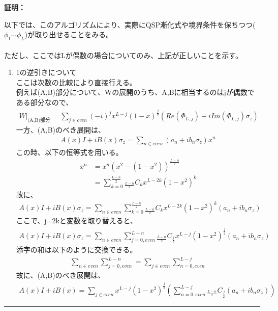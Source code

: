 \documentclass[a4paper,10.5pt]{article}
\numberwithin{equation}{section}
\newenvironment{proofbox}
{\begin{prooflabel}\textbf{証明：}\end{prooflabel}\vspace{0.8em}}
{\par\vspace{1em}\hrule\vspace{1em}}
\begin{document}
\begin{proofbox}
    以下では、このアルゴリズムにより、実際にQSP漸化式や境界条件を保ちつつ($\phi_{1}\cdots \phi_{L}$)が取り出せることをみる。\\
    \\
    ただし、ここではLが偶数の場合についてのみ、上記が正しいことを示す。
    \begin{enumerate}
        \item 1の逆引きについて\\
        ここは次数の比較により直接行える。\\
        例えば(A,B)部分について、Wの展開のうち、A,Bに相当するのはjが偶数である部分なので、
        \begin{align*}
            W|_{\text{(A,B)部分}}=\sum_{j\in even}(-i)^{j}x^{L-j}(1-x)^{\frac{j}{2}}(Re(\Phi_{L,j})+iIm(\Phi_{L,j})\sigma_{z})
        \end{align*}
        一方、(A,B)のべき展開は、
        \begin{align*}
            A(x)I+iB(x)\sigma_{z}=\sum_{n\in even}(a_{n}+ib_{n}\sigma_{z})x^{n}
        \end{align*}
        この時、以下の恒等式を用いる。
        \begin{align*}
            x^{n}&=x^{n}(x^{2}-(1-x^{2}))^{\frac{L-n}{2}}\\
            &=\sum_{k=0}^{\frac{L-n}{2}}{}_{\frac{L-n}{2}}C_{k}x^{L-2k}(1-x^{2})^{k}
        \end{align*}
        故に、
        \begin{align*}
            A(x)I+iB(x)\sigma_{z}=\sum_{n\in even}\sum_{k=0}^{\frac{L-n}{2}}{}_{\frac{L-n}{2}}C_{k}x^{L-2k}(1-x^{2})^{k}(a_{n}+ib_{n}\sigma_{z})
        \end{align*}
        ここで、j=2kと変数を取り替えると、
        \begin{align*}
            A(x)I+iB(x)\sigma_{z}=\sum_{n\in even}\sum_{j=0,even}^{L-n}{}_{\frac{L-n}{2}}C_{\frac{j}{2}}x^{L-j}(1-x^{2})^{\frac{j}{2}}(a_{n}+ib_{n}\sigma_{z})
        \end{align*}
        添字の和は以下のように交換できる。
        \begin{align*}
            \sum_{n\in even}\sum_{j=0,even}^{L-n}=\sum_{j\in even}\sum_{n=0,even}^{L-j}
        \end{align*}
        故に、(A,B)のべき展開は、
        \begin{align*}
            A(x)I+iB(x)=\sum_{j\in even}x^{L-j}(1-x^{2})^{\frac{j}{2}}(\sum_{n=0,even}^{L-j}{}_{\frac{L-n}{2}}C_{\frac{j}{2}}(a_{n}+ib_{n}\sigma_{z}))

\end{align*}
\end{enumerate}
\end{proofbox}
\end{document}
